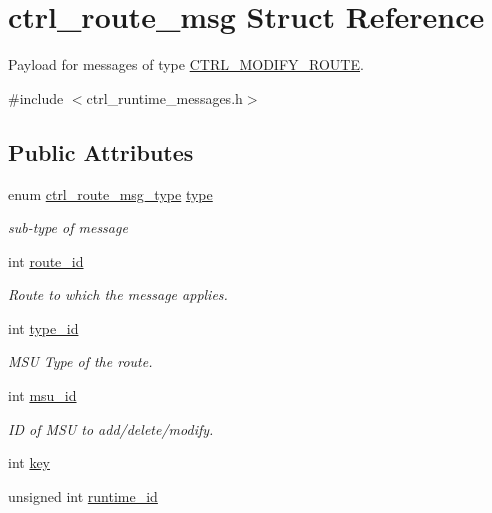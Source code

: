 \hypertarget{structctrl__route__msg}{\section{ctrl\-\_\-route\-\_\-msg Struct Reference}
\label{structctrl__route__msg}
}


Payload for messages of type \hyperlink{ctrl__runtime__messages_8h_aff250b7918a6975b13277c84bc6ec5b9a79d3d73ddfdd3bc9813806c4ca56a6e1}{C\-T\-R\-L\-\_\-\-M\-O\-D\-I\-F\-Y\-\_\-\-R\-O\-U\-T\-E}.  




{\ttfamily \#include $<$ctrl\-\_\-runtime\-\_\-messages.\-h$>$}

\subsection*{Public Attributes}
\begin{DoxyCompactItemize}
\item 
enum \hyperlink{ctrl__runtime__messages_8h_ad951c7380db78ed80db2c2484eb7daa8}{ctrl\-\_\-route\-\_\-msg\-\_\-type} \hyperlink{structctrl__route__msg_aa809d7c9ee772df20d285e8da7d71849}{type}
\begin{DoxyCompactList}\small\item\em sub-\/type of message \end{DoxyCompactList}\item 
int \hyperlink{structctrl__route__msg_ace2981a09919332eb535700c18e4ab19}{route\-\_\-id}
\begin{DoxyCompactList}\small\item\em Route to which the message applies. \end{DoxyCompactList}\item 
int \hyperlink{structctrl__route__msg_a3b818d3acb7a45f6e32a70d0ebfe0449}{type\-\_\-id}
\begin{DoxyCompactList}\small\item\em M\-S\-U Type of the route. \end{DoxyCompactList}\item 
int \hyperlink{structctrl__route__msg_a4b7d60f38753213c8377e9a04c6c02d4}{msu\-\_\-id}
\begin{DoxyCompactList}\small\item\em I\-D of M\-S\-U to add/delete/modify. \end{DoxyCompactList}\item 
int \hyperlink{structctrl__route__msg_a7451a70a3fb1930e1d8746b136d786e2}{key}
\item 
unsigned int \hyperlink{structctrl__route__msg_a87e6c3090932650f56352dd97b5089b3}{runtime\-\_\-id}
\end{DoxyCompactItemize}


